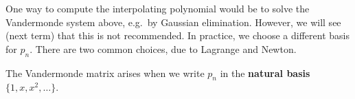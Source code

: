 \documentclass[
  letterpaper,
  DIV=11,
  numbers=noendperiod]{scrreprt}
\begin{document}
One way to compute the interpolating polynomial would be to solve the
Vandermonde system above, e.g.~by Gaussian elimination. However, we will
see (next term) that this is not recommended. In practice, we choose a
different basis for \(p_n\). There are two common choices, due to
Lagrange and Newton.

\begin{tcolorbox}[enhanced jigsaw, arc=.35mm, toprule=.15mm, colframe=quarto-callout-note-color-frame, left=2mm, toptitle=1mm, titlerule=0mm, breakable, opacityback=0, bottomtitle=1mm, title=\textcolor{quarto-callout-note-color}{\faInfo}\hspace{0.5em}{Note}, rightrule=.15mm, opacitybacktitle=0.6, colbacktitle=quarto-callout-note-color!10!white, colback=white, leftrule=.75mm, bottomrule=.15mm, coltitle=black]

The Vandermonde matrix arises when we write \(p_n\) in the
\textbf{natural basis} \(\{1,x,x^2,\ldots\}\).

\end{tcolorbox}
\end{document}
